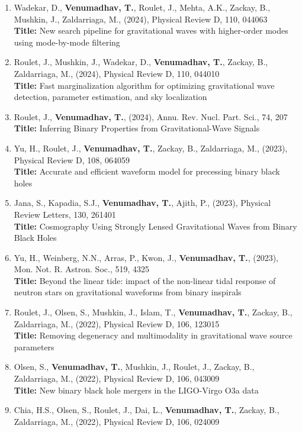 \documentclass{article}
\newcommand{\arnps}{Annu. Rev. Nucl. Part. Sci.}
\newcommand{\mnras}{Mon. Not. R. Astron. Soc.}
\newcommand{\prd}{Physical Review D}
\newcommand{\prl}{Physical Review Letters}
\begin{document}
{\begin{enumerate}[leftmargin=*,itemsep=0.45em,topsep=0.35em]
\textbf{Title:} In pursuit of Love numbers: First templated search for compact objects with large tidal deformabilities in the LIGO-Virgo data
\item Wadekar, D., \textbf{Venumadhav, T.}, Roulet, J., Mehta, A.K., Zackay, B., Mushkin, J., Zaldarriaga, M., (2024), \prd, 110, 044063 \\
\textbf{Title:} New search pipeline for gravitational waves with higher-order modes using mode-by-mode filtering
\item Roulet, J., Mushkin, J., Wadekar, D., \textbf{Venumadhav, T.}, Zackay, B., Zaldarriaga, M., (2024), \prd, 110, 044010 \\
\textbf{Title:} Fast marginalization algorithm for optimizing gravitational wave detection, parameter estimation, and sky localization
\item Roulet, J., \textbf{Venumadhav, T.}, (2024), \arnps, 74, 207 \\
\textbf{Title:} Inferring Binary Properties from Gravitational-Wave Signals
\item Yu, H., Roulet, J., \textbf{Venumadhav, T.}, Zackay, B., Zaldarriaga, M., (2023), \prd, 108, 064059 \\
\textbf{Title:} Accurate and efficient waveform model for precessing binary black holes
\item Jana, S., Kapadia, S.J., \textbf{Venumadhav, T.}, Ajith, P., (2023), \prl, 130, 261401 \\
\textbf{Title:} Cosmography Using Strongly Lensed Gravitational Waves from Binary Black Holes
\item Yu, H., Weinberg, N.N., Arras, P., Kwon, J., \textbf{Venumadhav, T.}, (2023), \mnras, 519, 4325 \\
\textbf{Title:} Beyond the linear tide: impact of the non-linear tidal response of neutron stars on gravitational waveforms from binary inspirals
\item Roulet, J., Olsen, S., Mushkin, J., Islam, T., \textbf{Venumadhav, T.}, Zackay, B., Zaldarriaga, M., (2022), \prd, 106, 123015 \\
\textbf{Title:} Removing degeneracy and multimodality in gravitational wave source parameters
\item Olsen, S., \textbf{Venumadhav, T.}, Mushkin, J., Roulet, J., Zackay, B., Zaldarriaga, M., (2022), \prd, 106, 043009 \\
\textbf{Title:} New binary black hole mergers in the LIGO-Virgo O3a data
\item Chia, H.S., Olsen, S., Roulet, J., Dai, L., \textbf{Venumadhav, T.}, Zackay, B., Zaldarriaga, M., (2022), \prd, 106, 024009 \\

\end{enumerate}}
\end{document}
